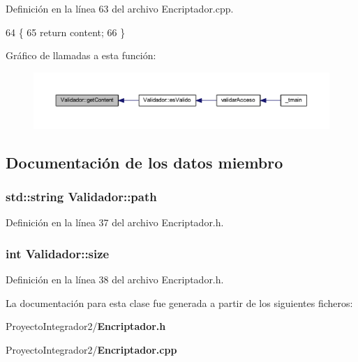 Definición en la línea 63 del archivo Encriptador.\-cpp.


\begin{DoxyCode}
64 \{
65     \textcolor{keywordflow}{return} content;
66 \}
\end{DoxyCode}


Gráfico de llamadas a esta función\-:
\nopagebreak
\begin{figure}[H]
\begin{center}
\leavevmode
\includegraphics[width=350pt]{class_validador_af37049c367add17c5f52e938608251f5_icgraph}
\end{center}
\end{figure}




\subsection{Documentación de los datos miembro}
\subsubsection[{path}]{\setlength{\rightskip}{0pt plus 5cm}std\-::string Validador\-::path}\label{class_validador_a55da861f4a63a702a554f4b0f4834749}


Definición en la línea 37 del archivo Encriptador.\-h.

\subsubsection[{size}]{\setlength{\rightskip}{0pt plus 5cm}int Validador\-::size}\label{class_validador_a34374bc7f9d8ffac55db94a6325e41bd}


Definición en la línea 38 del archivo Encriptador.\-h.



La documentación para esta clase fue generada a partir de los siguientes ficheros\-:\begin{DoxyCompactItemize}
\item 
Proyecto\-Integrador2/{\bf Encriptador.\-h}\item 
Proyecto\-Integrador2/{\bf Encriptador.\-cpp}\end{DoxyCompactItemize}
